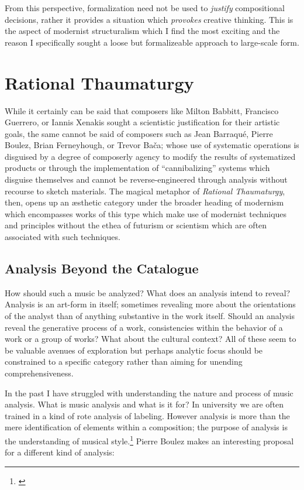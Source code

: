 From this perspective, formalization need not be used to \emph{justify} compositional decisions, rather it provides a situation which \emph{provokes} creative thinking. This is the aspect of modernist structuralism which I find the most exciting and the reason I specifically sought a loose but formalizeable approach to large-scale form.

\section{Rational Thaumaturgy}

While it certainly can be said that composers like Milton Babbitt, Francisco Guerrero, or Iannis Xenakis sought a scientistic justification for their artistic goals, the same cannot be said of composers such as Jean Barraqué, Pierre Boulez, Brian Ferneyhough, or Trevor Bača; whose use of systematic operations is disguised by a degree of composerly agency to modify the results of systematized products or through the implementation of ``cannibalizing'' systems which disguise themselves and cannot be reverse-engineered through analysis without recourse to sketch materials. The magical metaphor of \emph{Rational Thaumaturgy}, then, opens up an æsthetic category under the broader heading of modernism which encompasses works of this type which make use of modernist techniques and principles without the ethea of futurism or scientism which are often associated with such techniques.

\subsection{Analysis Beyond the Catalogue}

How should such a music be analyzed? What does an analysis intend to reveal? Analysis is an art-form in itself; sometimes revealing more about the orientations of the analyst than of anything substantive in the work itself. Should an analysis reveal the generative process of a work, consistencies within the behavior of a work or a group of works? What about the cultural context? All of these seem to be valuable avenues of exploration but perhaps analytic focus should be constrained to a specific category rather than aiming for unending comprehensiveness.

In the past I have struggled with understanding the nature and process of music analysis. What is music analysis and what is it for? In university we are often trained in a kind of rote analysis of labeling. However analysis is more than the mere identification of elements within a composition; the purpose of analysis is the understanding of musical style.\footnote{\citet[1]{white}} Pierre Boulez makes an interesting proposal for a different kind of analysis:

